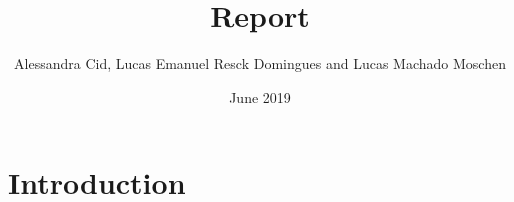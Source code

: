 \documentclass{article}
\title{Report}
\author{Alessandra Cid, Lucas Emanuel Resck Domingues and Lucas Machado Moschen}
\date{June 2019}
\begin{document}
\maketitle

\section{Introduction}
\end{document}
